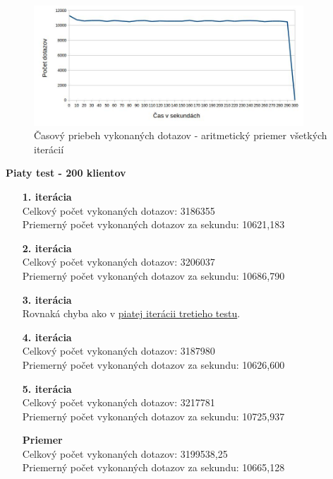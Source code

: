 \documentclass[12pt,oneside,final]{fithesis-utf8}
\begin{document}
\begin{itemize}
\begin{figure}[H]
  \centering
      \includegraphics[width=0.9\textwidth]{faban2_4_distr.jpg}
  \caption{Časový priebeh vykonaných dotazov - aritmetický priemer všetkých iterácií}
\end{figure}

\textbf{Piaty test - 200 klientov}
\begin{itemize}

\item[\textbf{1. iterácia}]\ \\
Celkový počet vykonaných dotazov: 3186355\\
Priemerný počet vykonaných dotazov za sekundu: 10621,183

\item[\textbf{2. iterácia}]\ \\
Celkový počet vykonaných dotazov: 3206037\\
Priemerný počet vykonaných dotazov za sekundu: 10686,790

\item[\textbf{3. iterácia}]\ \\
Rovnaká chyba ako v \hyperlink{label}{piatej iterácii tretieho testu}.

\item[\textbf{4. iterácia}]\ \\
Celkový počet vykonaných dotazov: 3187980\\
Priemerný počet vykonaných dotazov za sekundu: 10626,600

\item[\textbf{5. iterácia}]\ \\
Celkový počet vykonaných dotazov: 3217781\\
Priemerný počet vykonaných dotazov za sekundu: 10725,937

\item[\textbf{Priemer}]\ \\
Celkový počet vykonaných dotazov: 3199538,25\\
Priemerný počet vykonaných dotazov za sekundu: 10665,128


\end{itemize}
\end{itemize}
\end{document}
